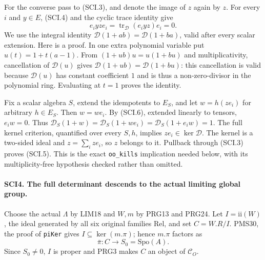 For the converse pass to (SCI.3), and denote the image of \(z\)
again by \(z\). For every \(i\) and \(y\in E\), (SCI.4)
and the cyclic trace identity give
\[
 e_i y z e_i=\operatorname{tr}_{\mathcal D}(e_i y z)e_i=0.
 \tag{SCI.6}
\]
We use the integral identity
\(\mathcal D(1+ab)=\mathcal D(1+ba)\), valid after every
scalar extension. Here is a proof. In one extra polynomial
variable put \(u(t)=1+t(a-1)\). From
\((1+u b)u=u(1+b u)\) and multiplicativity, cancellation of
\(\mathcal D(u)\) gives
\(\mathcal D(1+ub)=\mathcal D(1+bu)\): this cancellation is
valid because \(\mathcal D(u)\) has constant coefficient \(1\)
and is thus a non-zero-divisor in the polynomial ring. Evaluating
at \(t=1\) proves the identity.

Fix a scalar algebra \(S\), extend the idempotents to \(E_S\),
and let \(w=h(ze_i)\) for arbitrary \(h\in E_S\).
Then \(w=we_i\). By (SCI.6), extended linearly to tensors,
\(e_iw=0\). Thus
\(\mathcal D_S(1+w)=\mathcal D_S(1+we_i)
 =\mathcal D_S(1+e_iw)=1\).
The full kernel criterion, quantified over every \(S,h\),
implies \(ze_i\in\ker\mathcal D\). The kernel is a two-sided
ideal and \(z=\sum_i ze_i\), so \(z\) belongs to it.
Pullback through (SCI.3) proves (SCI.5). This is the exact
\texttt{oo\_kills} implication needed below, with its
multiplicity-free hypothesis checked rather than omitted.

\paragraph{SCI4. The full determinant descends to the actual limiting global group.}
\label{claim:SCI4}
Choose the actual \(\Lambda\) by LIM18 and \(W,m\) by PRG13
and PRG24. Let \(I=\mathrm{ii}(W)\), the ideal generated by
all six original families \(\mathrm{Rel}\), and set
\(C=W.R/I\). PMS30, the proof of \texttt{piKer} gives
\(I\subseteq\ker(m.\pi)\); hence \(m.\pi\) factors as
\[
 \bar\pi:C\longrightarrow S_0=\mathrm{Spo}(A).
 \tag{SCI.7}
\]
Since \(S_0\ne0\), \(I\) is proper and PRG3 makes
\(C\) an object of \(\mathcal C_O\).

